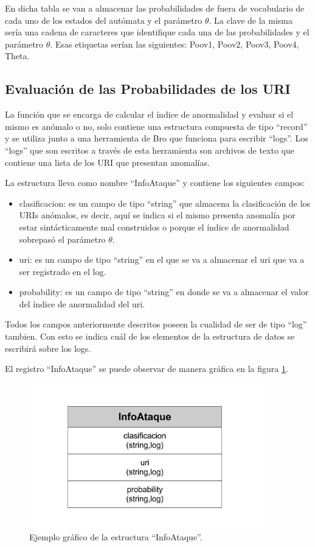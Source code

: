 En dicha tabla se van a almacenar las probabilidades de fuera de vocabulario de cada uno de los estados del autómata y el parámetro $\theta$. La clave de la misma sería una cadena de caracteres que identifique cada una de las probabilidades  y el parámetro  $\theta$. Esas etiquetas serían las siguientes: Poov1, Poov2, Poov3, Poov4, Theta.  

\subsection*{Evaluación de las Probabilidades de los URI}
\label{sssec:estructuraEvaluacion}

La función  que se encarga de calcular el índice de anormalidad  y evaluar si el mismo es anómalo o no, solo contiene una estructura compuesta de tipo ``record'' y se utiliza junto a una herramienta de Bro que funciona para escribir ``logs''. Los ``logs'' que son escritos a través de esta herramienta son archivos de texto que contiene una lista de los URI que presentan anomalías.

La estructura lleva como nombre ``InfoAtaque'' y contiene los siguientes campos:

\begin{itemize}
\item clasificacion: es un campo de tipo ``string'' que almacena la clasificación de los URIs anómalos, es decir, aquí se indica si el mismo presenta anomalía por estar sintácticamente mal construidos o porque el índice de anormalidad sobrepasó el parámetro $\theta$.
\item uri: es un campo de tipo ``string'' en el que se va a almacenar el uri que va a ser registrado en el log.
\item probability: es un campo de tipo ``string'' en donde se va a almacenar el valor del índice de anormalidad del uri.
\end{itemize}

Todos los campos anteriormente descritos poseen la cualidad de ser de tipo ``log'' tambien. Con esto se indica cuál de los elementos de la estructura de datos se escribirá sobre los logs.

    El registro ``InfoAtaque'' se puede observar de manera gráfica en la figura \ref{fig:InfoAtaque}. 
    
\begin{figure}[!htb]
\begin{center}
\includegraphics[width=4in]{./img/InfoAtaque.jpg}
\caption{Ejemplo gráfico de la estructura ``InfoAtaque''.}
\label{fig:InfoAtaque}
\end{center}
\end{figure}	

